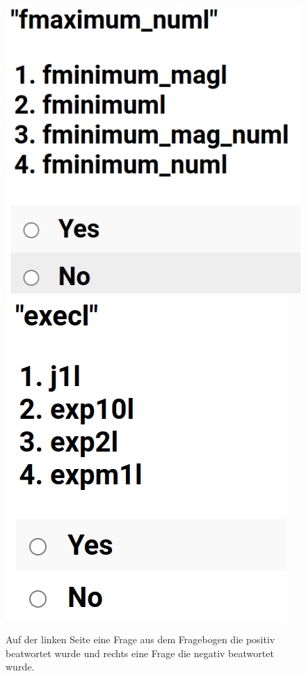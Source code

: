 \documentclass[12pt,letterpaper,ngerman]{article}
\begin{document}
\begin{figure}
  \begin{center}
    \includegraphics[scale=0.3]{abb/survey-example-positive.png}
    \includegraphics[scale=0.3]{abb/survey-example-negative.png}
  \end{center}
  \caption{
    Auf der linken Seite eine Frage aus dem Fragebogen die positiv
    beatwortet wurde und rechts eine Frage die negativ
    beatwortet wurde.
  }
\end{figure}
\end{document}
